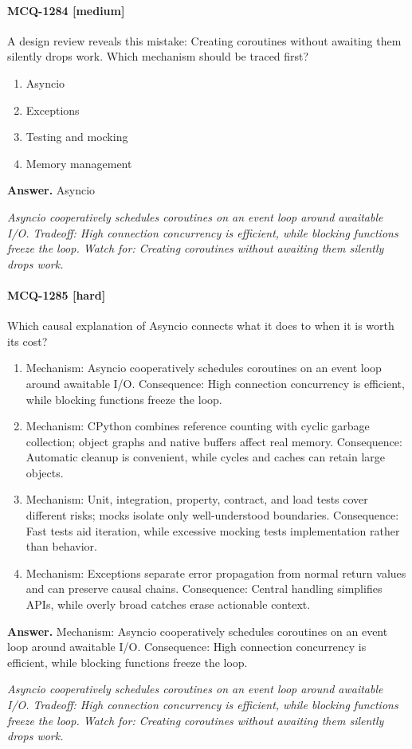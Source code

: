\paragraph{MCQ-1284 [medium]} A design review reveals this mistake: Creating coroutines without awaiting them silently drops work. Which mechanism should be traced first?
\begin{enumerate}[label=\Alph*.]
\item Asyncio
\item Exceptions
\item Testing and mocking
\item Memory management
\end{enumerate}
\noindent\textbf{Answer.} Asyncio
\par\textit{Asyncio cooperatively schedules coroutines on an event loop around awaitable I/O. Tradeoff: High connection concurrency is efficient, while blocking functions freeze the loop. Watch for: Creating coroutines without awaiting them silently drops work.}
\paragraph{MCQ-1285 [hard]} Which causal explanation of Asyncio connects what it does to when it is worth its cost?
\begin{enumerate}[label=\Alph*.]
\item Mechanism: Asyncio cooperatively schedules coroutines on an event loop around awaitable I/O. Consequence: High connection concurrency is efficient, while blocking functions freeze the loop.
\item Mechanism: CPython combines reference counting with cyclic garbage collection; object graphs and native buffers affect real memory. Consequence: Automatic cleanup is convenient, while cycles and caches can retain large objects.
\item Mechanism: Unit, integration, property, contract, and load tests cover different risks; mocks isolate only well-understood boundaries. Consequence: Fast tests aid iteration, while excessive mocking tests implementation rather than behavior.
\item Mechanism: Exceptions separate error propagation from normal return values and can preserve causal chains. Consequence: Central handling simplifies APIs, while overly broad catches erase actionable context.
\end{enumerate}
\noindent\textbf{Answer.} Mechanism: Asyncio cooperatively schedules coroutines on an event loop around awaitable I/O. Consequence: High connection concurrency is efficient, while blocking functions freeze the loop.
\par\textit{Asyncio cooperatively schedules coroutines on an event loop around awaitable I/O. Tradeoff: High connection concurrency is efficient, while blocking functions freeze the loop. Watch for: Creating coroutines without awaiting them silently drops work.}
